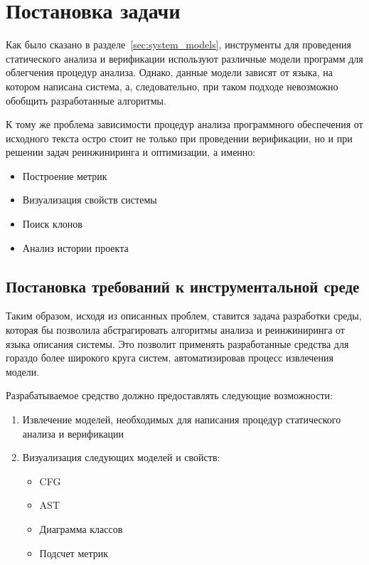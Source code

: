 \chapter{Постановка задачи}
\label{sec:task}
Как было сказано в разделе~\ref{sec:system_models}, инструменты для проведения
статического анализа и верификации используют различные модели программ для
облегчения процедур анализа. Однако, данные модели зависят от языка, на котором
написана система, а, следовательно, при таком подходе невозможно обобщить
разработанные алгоритмы.

К тому же проблема зависимости процедур анализа программного обеспечения от
исходного текста остро стоит не только при проведении верификации, но и при
решении задач реинжиниринга и оптимизации, а именно:

\begin{itemize}
    \item Построение метрик
    \item Визуализация свойств системы
    \item Поиск клонов
    \item Анализ истории проекта
\end{itemize}

\section{Постановка требований к инструментальной среде}

Таким образом, исходя из описанных проблем, ставится задача разработки среды,
которая бы позволила абстрагировать алгоритмы анализа и реинжиниринга от языка
описания системы. Это позволит применять разработанные средства для гораздо
более широкого круга систем, автоматизировав процесс извлечения модели.

Разрабатываемое средство должно предоставлять следующие возможности:

\begin{enumerate}
    \item Извлечение моделей, необходимых для написания процедур статического
    анализа и верификации
    \item Визуализация следующих моделей и свойств:
        \begin{itemize}
            \item CFG
            \item AST
            \item Диаграмма классов
            \item Подсчет метрик
        \end{itemize}
\end{enumerate}

